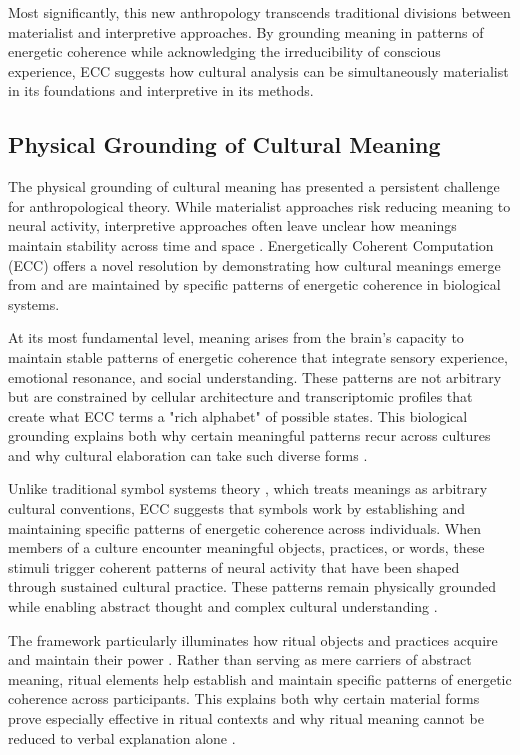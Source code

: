 Most significantly, this new anthropology transcends traditional divisions between materialist and interpretive approaches. By grounding meaning in patterns of energetic coherence while acknowledging the irreducibility of conscious experience, ECC suggests how cultural analysis can be simultaneously materialist in its foundations and interpretive in its methods.

\subsection{Physical Grounding of Cultural Meaning}

The physical grounding of cultural meaning has presented a persistent challenge for anthropological theory. While materialist approaches risk reducing meaning to neural activity, interpretive approaches often leave unclear how meanings maintain stability across time and space \cite{dandrade1995development}. Energetically Coherent Computation (ECC) offers a novel resolution by demonstrating how cultural meanings emerge from and are maintained by specific patterns of energetic coherence in biological systems.

At its most fundamental level, meaning arises from the brain's capacity to maintain stable patterns of energetic coherence that integrate sensory experience, emotional resonance, and social understanding. These patterns are not arbitrary but are constrained by cellular architecture and transcriptomic profiles that create what ECC terms a "rich alphabet" of possible states. This biological grounding explains both why certain meaningful patterns recur across cultures and why cultural elaboration can take such diverse forms \cite{bloch2012anthropology}.

Unlike traditional symbol systems theory \cite{harnad1990symbol}, which treats meanings as arbitrary cultural conventions, ECC suggests that symbols work by establishing and maintaining specific patterns of energetic coherence across individuals. When members of a culture encounter meaningful objects, practices, or words, these stimuli trigger coherent patterns of neural activity that have been shaped through sustained cultural practice. These patterns remain physically grounded while enabling abstract thought and complex cultural understanding \cite{lakoff1999philosophy}.

The framework particularly illuminates how ritual objects and practices acquire and maintain their power \cite{bell1992ritual}. Rather than serving as mere carriers of abstract meaning, ritual elements help establish and maintain specific patterns of energetic coherence across participants. This explains both why certain material forms prove especially effective in ritual contexts and why ritual meaning cannot be reduced to verbal explanation alone \cite{turner1967forest}.

